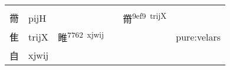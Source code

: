 \documentclass[14pt,a4paper]{scrartcl}
\begin{document}
\begin{longtable}[c]{@{}llllll@{}}
\begin{minipage}[t]{0.14\columnwidth}
\strut\end{minipage} &
\begin{minipage}[t]{0.14\columnwidth}\raggedright\strut
\strut\end{minipage}\tabularnewline
\begin{minipage}[t]{0.14\columnwidth}\raggedright\strut
黹
\strut\end{minipage} &
\begin{minipage}[t]{0.14\columnwidth}\raggedright\strut
pijH
\strut\end{minipage} &
\begin{minipage}[t]{0.14\columnwidth}\raggedright\strut
\strut\end{minipage} &
\begin{minipage}[t]{0.14\columnwidth}\raggedright\strut
\strut\end{minipage} &
\begin{minipage}[t]{0.14\columnwidth}\raggedright\strut
黹\textsuperscript{9ef9~trijX}
\strut\end{minipage} &
\begin{minipage}[t]{0.14\columnwidth}\raggedright\strut
\strut\end{minipage}\tabularnewline
\begin{minipage}[t]{0.14\columnwidth}\raggedright\strut
隹
\strut\end{minipage} &
\begin{minipage}[t]{0.14\columnwidth}\raggedright\strut
trijX
\strut\end{minipage} &
\begin{minipage}[t]{0.14\columnwidth}\raggedright\strut
睢\textsuperscript{7762~xjwij}
\strut\end{minipage} &
\begin{minipage}[t]{0.14\columnwidth}\raggedright\strut
\strut\end{minipage} &
\begin{minipage}[t]{0.14\columnwidth}\raggedright\strut
\strut\end{minipage} &
\begin{minipage}[t]{0.14\columnwidth}\raggedright\strut
pure:velars
\strut\end{minipage}\tabularnewline
\begin{minipage}[t]{0.14\columnwidth}\raggedright\strut
自
\strut\end{minipage} &
\begin{minipage}[t]{0.14\columnwidth}\raggedright\strut
xjwij
\strut\end{minipage} &
\begin{minipage}[t]{0.14\columnwidth}\raggedright\strut

\end{minipage}
\end{longtable}
\end{document}
